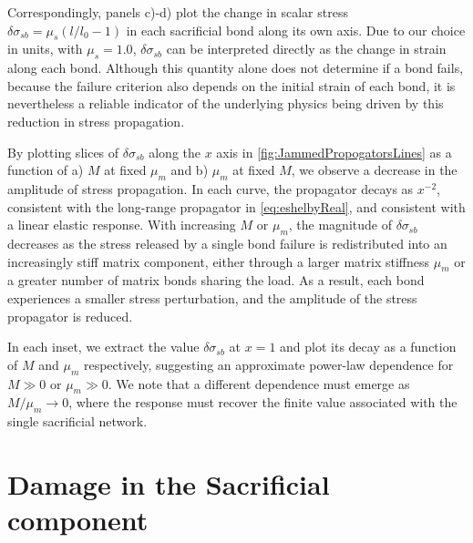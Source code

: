 Correspondingly, panels c)-d) plot the change in scalar stress $\delta \sigma_{sb} = \mu_s\left(l/l_0 -1 \right)$ in each sacrificial bond along its own axis. Due to our choice in units, with $\mu_s=1.0$, $\delta \sigma_{sb}$ can be interpreted directly as the change in strain along each bond. Although this quantity alone does not determine if a bond fails, because the failure criterion also depends on the initial strain of each bond, it is nevertheless a reliable indicator of the underlying physics being driven by this reduction in stress propagation. 

By plotting slices of $\delta \sigma_{sb}$ along the $x$ axis in \cref{fig:JammedPropogatorsLines} as a function of a) $M$ at fixed $\mu_m$ and b) $\mu_m$ at fixed $M$, we observe a decrease in the amplitude of stress propagation. In each curve, the propagator decays as $x^{-2}$, consistent with the long-range propagator in \cref{eq:eshelbyReal}, and consistent with a linear elastic response. With increasing $M$ or $\mu_m$, the magnitude of $\delta \sigma_{sb}$ decreases as the stress released by a single bond failure is redistributed into an increasingly stiff matrix component, either through a larger matrix stiffness $\mu_m$ or a greater number of matrix bonds sharing the load. As a result, each bond experiences a smaller stress perturbation, and the amplitude of the stress propagator is reduced.

In each inset, we extract the value $\delta \sigma_{sb}$ at $x = 1$ and plot its decay as a function of $M$ and $\mu_m$ respectively, suggesting an approximate power-law dependence for $M \gg 0$ or $\mu_m \gg 0$. We note that a different dependence must emerge as $M/\mu_m \to 0$, where the response must recover the finite value associated with the single sacrificial network.

\section{Damage in the Sacrificial component}

